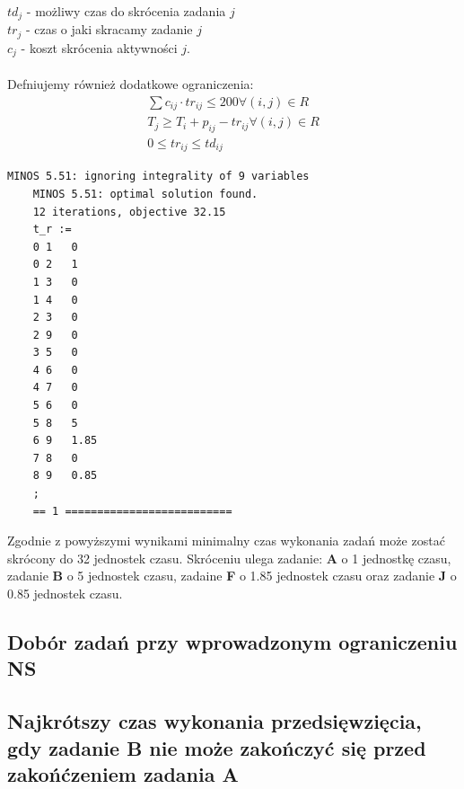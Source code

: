 \documentclass[
    12pt, %
]{../fphw}
\begin{document}
\(td_j\) - możliwy czas do skrócenia zadania \(j\) \\
\(tr_j\) - czas o jaki skracamy zadanie \(j\) \\
\(c_j\) - koszt skrócenia aktywności \(j\). \\ \\
Defniujemy również dodatkowe ograniczenia:
\begin{align*}
    \sum c_{ij} \cdot tr_{ij} \leq 200 \forall (i, j) \in R \\
    T_j \geq T_i + p_{ij} - tr_{ij} \forall (i,j) \in R     \\
    0 \leq tr_{ij} \leq td_{ij}
\end{align*}


\begin{lstlisting}[caption=Rozwiązanie znalezione solwerem minos]
    MINOS 5.51: ignoring integrality of 9 variables
    MINOS 5.51: optimal solution found.
    12 iterations, objective 32.15
    t_r :=
    0 1   0
    0 2   1
    1 3   0
    1 4   0
    2 3   0
    2 9   0
    3 5   0
    4 6   0
    4 7   0
    5 6   0
    5 8   5
    6 9   1.85
    7 8   0
    8 9   0.85
    ;
    == 1 ==========================
\end{lstlisting}
Zgodnie z powyższymi wynikami minimalny czas wykonania zadań może zostać skrócony do 32 jednostek czasu.
Skróceniu ulega zadanie: \textbf{A} o 1 jednostkę czasu,
zadanie \textbf{B} o 5 jednostek czasu, zadaine \textbf{F} o 1.85 jednostek czasu
oraz zadanie \textbf{J} o 0.85 jednostek czasu.
\subsection{Dobór zadań przy wprowadzonym ograniczeniu NS}
\subsection{Najkrótszy czas wykonania przedsięwzięcia, gdy zadanie B nie może zakończyć się przed zakońćzeniem zadania A}
\newpage
\lstlistoflistings
\listoffigures
\listoftables
\end{document}
